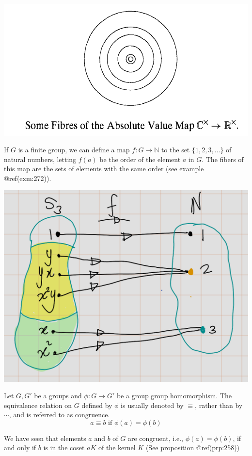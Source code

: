 \documentclass[
]{book}
\begin{document}
\includegraphics{figures/ch_2/fig33.png}

\leavevmode{}%
If \(G\) is a finite group, we can define a map \(f : G \to \mathbb{N}\)
to the set \(\{1, 2, 3, \ldots\}\) of natural numbers, letting \(f(a)\)
be the order of the element \(a\) in \(G\). The fibers of this map are
the sets of elements with the same order (see example @ref(exm:272)).

\includegraphics{figures/ch_2/fig34.png}

\leavevmode{}%
Let \(G,G'\) be a groups and \(\phi: G \rightarrow G'\) be a group group
homomorphism. The equivalence relation on \(G\) defined by \(\phi\) is
usually denoted by \(\equiv\), rather than by \(\sim\), and is referred
to as congruence. \[a \equiv b \text{ if }\phi(a) = \phi(b)\]

We have seen that elements \(a\) and \(b\) of \(G\) are congruent, i.e.,
\(\phi(a) = \phi(b)\), if and only if \(b\) is in the coset \(a K\) of
the kernel \(K\) (See proposition @ref(prp:258))
\end{document}
